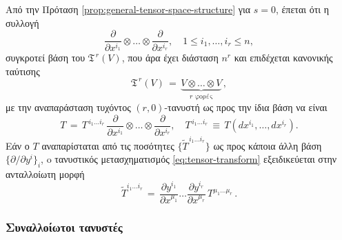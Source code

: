 \documentclass[11pt,a4paper,twoside,openright]{book}
\begin{document}
Από την Πρόταση \ref{prop:general-tensor-space-structure} για $s=0$, έπεται ότι η συλλογή
\begin{equation}\label{eq:contravariant-tensor-space-base}
\frac{\partial}{\partial x^{i_1}} \otimes \dots \otimes \frac{\partial}{\partial x^{i_r}},
\quad
1 \le i_1, \dots, i_r \le n,
\end{equation}
συγκροτεί βάση του $\mathfrak{T}^{\,r}(V)$, που άρα έχει διάσταση $n^r$ και επιδέχεται κανονικής ταύτισης
\begin{equation}\label{eq:contravariant-space-canonical-isomorphism}
\mathfrak{T}^{\,r}(V)
\,=\,
\underbrace{V \otimes \dots \otimes V}_{r \text{ φορές}}\,,
\end{equation}
με την αναπαράσταση τυχόντος $(r,0)$-τανυστή ως προς την ίδια βάση να είναι
\begin{equation}\label{eq:contravariant-tensor-representation}
T
\,=\,
T^{\,i_1 \dots i_r} \, \frac{\partial}{\partial x^{i_1}} \otimes \dots \otimes \frac{\partial}{\partial x^{i_r}},
\quad
T^{\,i_1 \dots i_r} \,\equiv\, T\left(dx^{i_1}, \dots, dx^{i_r}\right).
\end{equation}
Εάν ο $Τ$ αναπαρίσταται από τις ποσότητες
$\{\widetilde{T}^{\,i_1 \dots i_r}\}$ ως προς κάποια άλλη
βάση $\{\partial/\partial y^i\}_i$,
o τανυστικός μετασχηματισμός \eqref{eq:tensor-transform}
εξειδικεύεται στην ανταλλοίωτη μορφή
\begin{equation}\label{eq:contravariant-tensor-transfor}
\widetilde{T}^{i_1 \dots i_r}
\,=\,
\frac{\partial y^{i_1}}{\partial x^{\mu_1}} \dots \frac{\partial y^{i_r}}{\partial x^{\mu_r}}
\,
T^{\mu_1 \dots \mu_r}\,.
\end{equation}

\subsubsection{Συναλλοίωτοι τανυστές}
	\label{sec:covariant-tensors}
	
\end{document}
